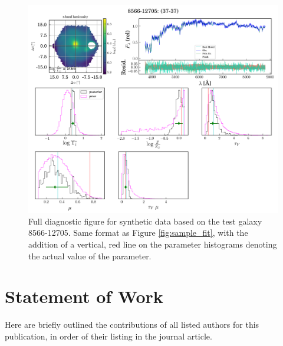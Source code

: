 \begin{figure}
    \centering
    \includegraphics[width=\textwidth,height=\textheight,keepaspectratio]{8566-12705_fulldiag_37-37_mock}
    \caption[Full diagnostic figure for synthetic data based on the test galaxy 8566-12705]{Full diagnostic figure for synthetic data based on the test galaxy 8566-12705. Same format as Figure \ref{fig:sample_fit}, with the addition of a vertical, red line on the parameter histograms denoting the actual value of the parameter.}
    \label{fig:full_diag_fake}
\end{figure}

\section{Statement of Work}
\label{chap1:apdx:statement_of_work}

Here are briefly outlined the contributions of all listed authors for this publication, in order of their listing in the journal article.

